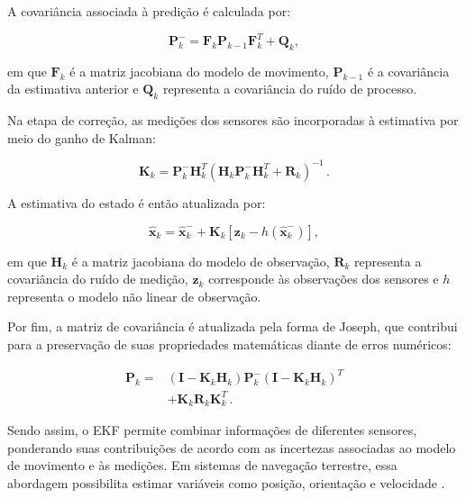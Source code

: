 A covariância associada à predição é calculada por:

\begin{equation}
    \mathbf{P}_{k}^{-} =
    \mathbf{F}_{k}\mathbf{P}_{k-1}
    \mathbf{F}_{k}^{T}+\mathbf{Q}_{k},
    \label{eq:ekf_cov_predicao}
\end{equation}

em que $\mathbf{F}_{k}$ é a matriz jacobiana do modelo de movimento, $\mathbf{P}_{k-1}$ é a covariância da estimativa anterior e $\mathbf{Q}_{k}$ representa a covariância do ruído de processo. 

Na etapa de correção, as medições dos sensores são incorporadas à estimativa por meio do ganho de Kalman: 

\begin{equation}
    \mathbf{K}_{k} =
    \mathbf{P}_{k}^{-}\mathbf{H}_{k}^{T}
    \left(
    \mathbf{H}_{k}\mathbf{P}_{k}^{-}
    \mathbf{H}_{k}^{T}+\mathbf{R}_{k}
    \right)^{-1} \,.
    \label{eq:ekf_ganho}
\end{equation}

A estimativa do estado é então atualizada por:

\begin{equation}
    \hat{\mathbf{x}}_{k} =
    \hat{\mathbf{x}}_{k}^{-}+
    \mathbf{K}_{k}
    \left[
    \mathbf{z}_{k}-
    h(\hat{\mathbf{x}}_{k}^{-}) 
    \right],
    \label{eq:ekf_correcao}
\end{equation}

em que $\mathbf{H}_{k}$ é a matriz jacobiana do modelo de observação, $\mathbf{R}_{k}$ representa a covariância do ruído de medição, $\mathbf{z}_{k}$ corresponde às observações dos sensores e $h$ representa o modelo não linear de observação. 

Por fim, a matriz de covariância é atualizada pela forma de Joseph, que contribui para a preservação de suas propriedades matemáticas diante de erros numéricos: 

\begin{equation}
\begin{aligned}
    \mathbf{P}_{k} ={}&
    (\mathbf{I}-\mathbf{K}_{k}\mathbf{H}_{k})
    \mathbf{P}_{k}^{-}
    (\mathbf{I}-\mathbf{K}_{k}\mathbf{H}_{k})^{T}\\
    &+\mathbf{K}_{k}\mathbf{R}_{k}\mathbf{K}_{k}^{T}\,.
\end{aligned}
    \label{eq:ekf_cov_correcao}
\end{equation}

Sendo assim, o EKF permite combinar informações de diferentes sensores, ponderando suas contribuições de acordo com as incertezas associadas ao modelo de movimento e às medições. Em sistemas de navegação terrestre, essa abordagem possibilita estimar variáveis como posição, orientação e velocidade \citep{Thrun2006}. 

